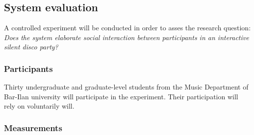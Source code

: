 \documentclass[a4paper,11pt]{article}
\begin{document}
\subsection{System evaluation}\label{methods:evaluation}

A controlled experiment will be conducted in order to asses the research question: \emph{Does the system elaborate social interaction between participants in an interactive silent disco party?}

\subsubsection{Participants}

Thirty undergraduate and graduate-level students from the Music Department of Bar-Ilan university will participate in the experiment.
Their participation will rely on voluntarily will.

\subsubsection{Measurements}
\end{document}
